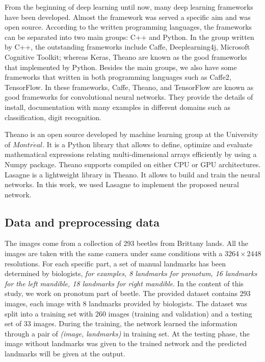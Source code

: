 \documentclass[conference]{IEEEtran}
\begin{document}
From the beginning of deep learning until now, many deep learning frameworks have been developed. Almost the framework was served a specific aim and was open source. According to the written programming languages, the frameworks can be separated into two main groups: C++ and Python. In the group written by C++, the outstanding frameworks include Caffe\cite{jia2014caffe}, Deeplearning4j, Microsoft Cognitive Toolkit\cite{yu2014introduction}; whereas Keras\cite{chollet2015keras}, Theano\cite{2016arXiv160502688short} are known as the good frameworks that implemented by Python. Besides the main groups, we also have some frameworks that written in both programming languages such as Caffe2\cite{jia2014caffe}, TensorFlow\cite{abadi2016tensorflow}. In these frameworks, Caffe, Theano, and TensorFlow are known as good frameworks for convolutional neural networks. They provide the details of install, documentation with many examples in different domains such as classification, digit recognition.

Theano is an open source developed by machine learning group at the University of $Montr\acute{e}al$. It is a Python library that allows to define, optimize and evaluate mathematical expressions relating multi-dimensional arrays efficiently by using a Numpy package. Theano supports compiled on either CPU or GPU architectures. Lasagne\cite{lasagne} is a lightweight library in Theano. It allows to build and train the neural networks. In this work, we used Lasagne to implement the proposed neural network.
\subsection{Data and preprocessing data}
The images come from a collection of 293 beetles from Brittany lands. All the images are taken with the same camera under same conditions with a $3264 \times 2448$ resolutions. For each specific part, a set of manual landmarks has been determined by biologists, \textit{for examples, 8 landmarks for pronotum, 16 landmarks for the left mandible, 18 landmarks for right mandible}. In the content of this study, we work on pronotum part of beetle. The provided dataset contains 293 images, each image with 8 landmarks provided by biologists. The dataset was split into a training set with 260 images (training and validation) and a testing set of 33 images. During the training, the network learned the information through a pair of \textit{(image, landmarks)} in training set. At the testing phase, the image without landmarks was given to the trained network and the predicted landmarks will be given at the output.
\end{document}
